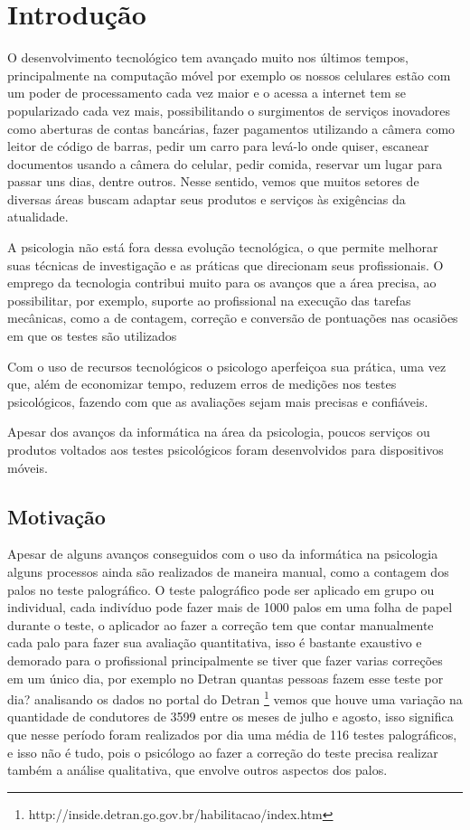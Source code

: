 \chapter{Introdução}
\label{cap:intro}


O desenvolvimento tecnológico tem avançado muito nos últimos tempos, principalmente na computação móvel por exemplo os nossos celulares  estão com um poder de processamento cada vez maior e o acessa a internet tem se popularizado cada vez mais, possibilitando o surgimentos de serviços inovadores como aberturas de contas bancárias, fazer pagamentos utilizando a câmera como leitor de código de barras, pedir um carro para levá-lo onde quiser, escanear documentos usando a câmera do celular, pedir comida, reservar um lugar para passar uns dias, dentre outros. Nesse sentido, vemos que muitos setores de diversas áreas buscam  adaptar seus produtos e serviços às exigências da atualidade.

A psicologia não está fora dessa evolução tecnológica, o que permite melhorar suas técnicas de investigação e as práticas que direcionam seus profissionais. O emprego da tecnologia contribui muito para os avanços que a área precisa, ao possibilitar, por exemplo, suporte ao profissional na execução das tarefas mecânicas, como a de contagem, correção e conversão de pontuações nas ocasiões em que os testes são utilizados \cite{psico-artigo}

Com o uso de recursos tecnológicos o psicologo aperfeiçoa sua prática, uma vez que, além de economizar tempo, reduzem erros de medições nos testes psicológicos, fazendo com que as avaliações sejam mais precisas e confiáveis.

Apesar dos avanços da informática na área da psicologia, poucos serviços ou produtos voltados aos testes psicológicos foram desenvolvidos para  dispositivos móveis.

\section{Motivação}
\label{sec:motiv}
Apesar de alguns avanços conseguidos com o uso da informática na psicologia alguns processos ainda são realizados de maneira manual, como a contagem dos palos no teste palográfico.
O teste palográfico pode ser aplicado em grupo ou individual, cada indivíduo pode fazer mais de 1000 palos em uma folha de papel durante o teste, o aplicador ao fazer a correção tem que contar manualmente cada palo para fazer sua avaliação quantitativa, isso é bastante exaustivo e demorado para o profissional principalmente se tiver que fazer varias correções em um único dia, por exemplo no Detran quantas pessoas fazem esse teste por dia? analisando os dados no portal do Detran \footnote{http://inside.detran.go.gov.br/habilitacao/index.htm} vemos que houve uma variação na quantidade de condutores de 3599 entre os meses de julho e agosto,  isso significa que nesse período foram realizados por dia uma média de 116 testes palográficos, e isso não é tudo, pois o psicólogo ao fazer a correção do teste  precisa realizar também a análise qualitativa, que envolve outros aspectos dos palos. 

